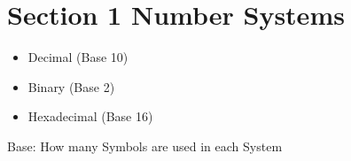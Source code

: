 \documentclass[Numbers-MASTER.tex]{subfiles}
\begin{document}
\section{Section 1 Number Systems}

\begin{frame}
\begin{itemize}
\item Decimal (Base 10)
\item Binary (Base 2) 
\item Hexadecimal (Base 16)
\end{itemize}
Base: How many Symbols are used in each System
\end{frame}
\end{document}
